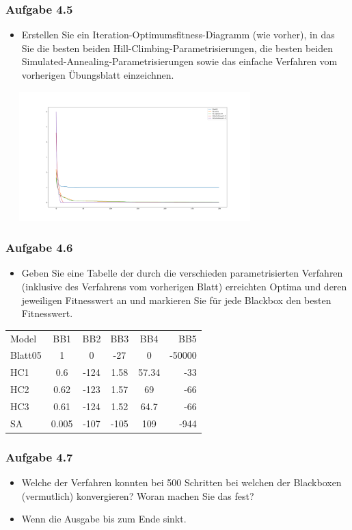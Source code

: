 \documentclass[xcolor=pdftex,dvipsnames,table]{beamer}
\begin{document}
\begin{frame}
  \frametitle{Aufgabe 4.5}
  \begin{itemize}
  		\item Erstellen Sie ein Iteration-Optimumsfitness-Diagramm (wie vorher), in das Sie die besten beiden
Hill-Climbing-Parametrisierungen, die besten beiden Simulated-Annealing-Parametrisierungen sowie
das einfache Verfahren vom vorherigen Übungsblatt einzeichnen.
  \end{itemize}
\includegraphics[width=100mm, height=50mm]{img/a5.png} 
\end{frame}

\begin{frame}
  \frametitle{Aufgabe 4.6}
  \begin{itemize}
  		\item Geben Sie eine Tabelle der durch die verschieden parametrisierten Verfahren (inklusive des
Verfahrens vom vorherigen Blatt) erreichten Optima und deren jeweiligen Fitnesswert an und
markieren Sie für jede Blackbox den besten Fitnesswert.

  \end{itemize}
\center
 \begin{tabular}{ l | c | c | c | c | r }
  \hline			
  Model & BB1 & BB2 & BB3 & BB4 & BB5 \\
  Blatt05 & 1 & 0 & -27 & 0 & -50000 \\
  HC1 & 0.6 & -124 & 1.58 & 57.34 & -33 \\
  HC2 & 0.62 & -123 & 1.57 & 69 & -66 \\
  HC3 & 0.61 & -124 & 1.52 & 64.7 & -66 \\
  SA & 0.005 & -107 & -105 & 109 & -944 \\
  \hline  
\end{tabular}   

\end{frame}

\begin{frame}
  \frametitle{Aufgabe 4.7}
  \begin{itemize}
  		\item Welche der Verfahren konnten bei 500 Schritten bei welchen der Blackboxen (vermutlich) konvergieren?
Woran machen Sie das fest?

\item Wenn die Ausgabe bis zum Ende sinkt.
  \end{itemize}
\end{frame}
\end{document}
